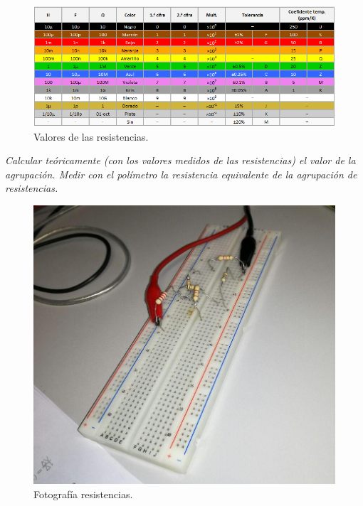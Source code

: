 \documentclass[paper=a4, fontsize=11pt]{scrartcl} %
\numberwithin{equation}{section} %
\numberwithin{figure}{section} %
\numberwithin{table}{section} %
\begin{document}
\begin{figure}[h]
	\centering
	\includegraphics[scale=0.5]{image/valor-resistencia}
		\caption{Valores de las resistencias.} \label{Color-resistencia}
\end{figure}

\newpage

\textit{Calcular teóricamente (con los valores medidos de las resistencias) el valor de la agrupación. Medir con el polímetro la resistencia equivalente de la agrupación de resistencias.} 

\begin{figure}[h]
	\centering
	\includegraphics[scale=0.4]{image/practica1-resistencias2}
	\caption{Fotografía resistencias.} \label{Color-resistencia}
\end{figure}
\end{document}
